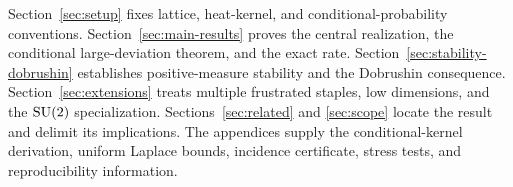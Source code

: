 Section~\ref{sec:setup} fixes lattice, heat-kernel, and conditional-probability
conventions.  Section~\ref{sec:main-results} proves the central realization,
the conditional large-deviation theorem, and the exact rate.
Section~\ref{sec:stability-dobrushin} establishes positive-measure stability
and the Dobrushin consequence.  Section~\ref{sec:extensions} treats multiple
frustrated staples, low dimensions, and the $\mathrm{SU}(2)$ specialization.
Sections~\ref{sec:related} and \ref{sec:scope} locate the result and delimit
its implications.  The appendices supply the conditional-kernel derivation,
uniform Laplace bounds, incidence certificate, stress tests, and
reproducibility information.
